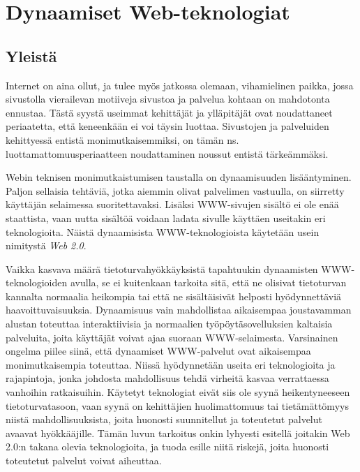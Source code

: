 
\chapter{Dynaamiset Web-teknologiat}

\section{Yleistä}

Internet on aina ollut, ja tulee myös jatkossa olemaan, vihamielinen paikka, jossa sivustolla vierailevan motiiveja sivustoa ja palvelua kohtaan on mahdotonta ennustaa. Tästä syystä 
useimmat kehittäjät ja ylläpitäjät ovat noudattaneet periaatetta, että keneenkään ei voi täysin luottaa. Sivustojen ja palveluiden kehittyessä entistä monimutkaisemmiksi, on tämän 
ns. luottamattomuusperiaatteen noudattaminen noussut entistä tärkeämmäksi.

Webin teknisen monimutkaistumisen taustalla on dynaamisuuden lisääntyminen. Paljon sellaisia tehtäviä, jotka aiemmin olivat palvelimen vastuulla, on siirretty käyttäjän selaimessa 
suoritettavaksi. Lisäksi WWW-sivujen sisältö ei ole enää staattista, vaan uutta sisältöä voidaan ladata sivulle käyttäen useitakin eri teknologioita. Näistä dynaamisista WWW-teknologioista
käytetään usein nimitystä \emph{Web 2.0}.

Vaikka kasvava määrä tietoturvahyökkäyksistä tapahtuukin dynaamisten WWW-teknologioiden avulla, se ei kuitenkaan tarkoita sitä, että ne olisivat tietoturvan kannalta normaalia heikompia 
tai että ne sisältäisivät helposti hyödynnettäviä haavoittuvaisuuksia. Dynaamisuus vain mahdollistaa aikaisempaa joustavamman alustan toteuttaa interaktiivisia ja normaalien työpöytäsovelluksien 
kaltaisia palveluita, joita käyttäjät voivat ajaa suoraan WWW-selaimesta. Varsinainen ongelma piilee siinä, että dynaamiset WWW-palvelut ovat aikaisempaa monimutkaisempia toteuttaa. Niissä 
hyödynnetään useita eri teknologioita ja rajapintoja, jonka johdosta mahdollisuus tehdä virheitä kasvaa verrattaessa vanhoihin ratkaisuihin. Käytetyt teknologiat eivät siis ole syynä heikentyneeseen 
tietoturvatasoon, vaan syynä on kehittäjien huolimattomuus tai tietämättömyys niistä mahdollisuuksista, joita huonosti suunnitellut ja toteutetut palvelut avaavat hyökkääjille.
Tämän luvun tarkoitus onkin lyhyesti esitellä joitakin Web 2.0:n takana olevia teknologioita, ja tuoda esille niitä riskejä, joita huonosti toteutetut palvelut voivat aiheuttaa.


